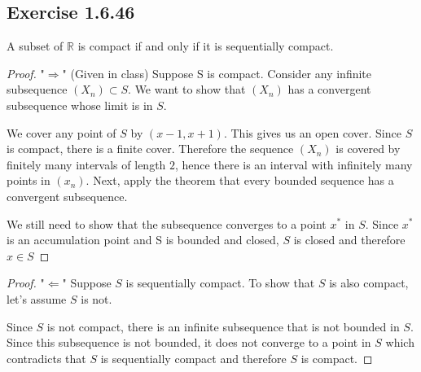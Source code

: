 \documentclass{tufte-book}
\theoremstyle{mytheoremstyle}
\theoremstyle{mylemstyle}
\theoremstyle{mydefstyle}
\begin{document}
\subsection{Exercise 1.6.46}

A subset of $\mathbb{R}$ is compact if and only if it is sequentially compact.

\begin{proof}"$\Rightarrow$" (Given in class)
Suppose S is compact. Consider any infinite subsequence $(X_n) \subset S$.  We want to show that $(X_n)$ has a convergent subsequence whose limit is in $S$.

We cover any point of $S$ by $(x-1, x+1)$.  This gives us an open cover.  Since $S$ is compact, there is a finite cover.  Therefore the sequence $(X_n)$ is covered by finitely many intervals of length $2$, hence there is an interval with infinitely many points in $(x_n)$.  Next, apply the theorem that every bounded sequence has a convergent subsequence.  

We still need to show that the subsequence converges to a point $x^*$ in $S$. Since $x^*$ is an accumulation point and S is bounded and closed, $S$ is closed and therefore $x \in S$

\end{proof}

\begin{proof}"$\Leftarrow$"
Suppose $S$ is sequentially compact. To show that $S$ is also compact, let's assume $S$ is not.

Since $S$ is not compact, there is an infinite subsequence that is not bounded in $S$.  Since this subsequence is not bounded, it does not converge to a point in $S$ which contradicts that $S$ is sequentially compact and therefore $S$ is compact.
\end{proof}
\end{document}
